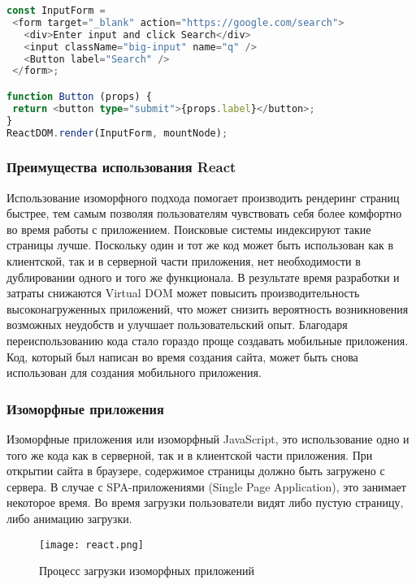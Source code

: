 \begin{lstlisting}[language=TypeScript, label=lst:domain:typescript]
const InputForm =
 <form target="_blank" action="https://google.com/search">
   <div>Enter input and click Search</div>
   <input className="big-input" name="q" />
   <Button label="Search" />
 </form>;

function Button (props) {
 return <button type="submit">{props.label}</button>;
}
ReactDOM.render(InputForm, mountNode);

\end{lstlisting}

\subsubsection{Преимущества использования React}

Использование изоморфного подхода помогает производить рендеринг страниц быстрее, тем самым позволяя пользователям чувствовать 
себя более комфортно во время работы с приложением. Поисковые системы индексируют такие страницы лучше. Поскольку один и тот же код может 
быть использован как в клиентской, так и в серверной части приложения, нет необходимости в дублировании одного и того же функционала. В результате время 
разработки и затраты снижаются
Virtual DOM может повысить производительность высоконагруженных приложений, что может снизить вероятность возникновения возможных неудобств и улучшает 
пользовательский опыт. Благодаря переиспользованию кода стало гораздо проще создавать мобильные приложения. Код, который был написан во время создания сайта, 
может быть снова использован для создания мобильного приложения. 

\subsubsection{Изоморфные приложения}

Изоморфные приложения или изоморфный JavaScript, это использование одно и того же кода как в серверной, так и в клиентской части приложения. При открытии 
сайта в браузере, содержимое страницы должно быть загружено с сервера. В случае с SPA-приложениями (Single Page Application), это занимает некоторое время. Во время загрузки 
пользователи видят либо пустую страницу, либо анимацию загрузки. 

\begin{figure}[ht]
\centering
  \texttt{[image: react.png]}
  \caption{Процесс загрузки изоморфных приложений}
  \label{figure:domain:react}
\end{figure}


